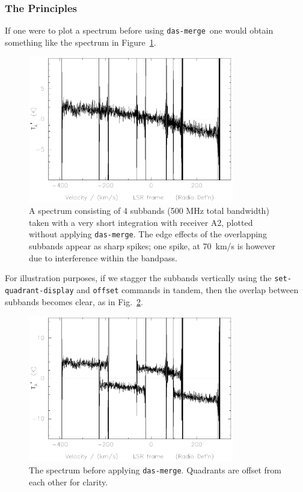 \documentclass[11pt,twoside]{starlink}
\providecommand{\dm}{\texttt{das-merge}}
\begin{document}
\subsubsection{The Principles}
If one were to plot a spectrum before using \dm\ one would obtain
something like the spectrum in Figure~\ref{fig:dm_dirty}.
%
\begin{figure}[htb]
\centering
\includegraphics[width=0.8\textwidth]{sc8_dm_dirty}
\caption[Spectrum without \dm ]
{\small{A spectrum consisting of 4 subbands (500 MHz total bandwidth)
taken with a very short integration with receiver A2, plotted without
applying \dm .  The edge effects of the overlapping subbands appear as
sharp spikes; one spike, at 70~km/s is however due to interference
within the bandpass.}}
\label{fig:dm_dirty}
\end{figure}

For illustration purposes, if we stagger the subbands vertically
using the \texttt{set-quadrant-display} and \texttt{offset} commands in
tandem, then the overlap between subbands becomes clear, as in
Fig.~\ref{fig:before-das-merge}.

\begin{figure}[ht]
\centering
\includegraphics[width=0.8\textwidth]{sc8_dm_orig}
\caption[Before \texttt{das-merge}]
{\small{The spectrum before applying \texttt{das-merge}. Quadrants are
offset from each other for clarity.
}}
\label{fig:before-das-merge}
\end{figure}
\end{document}
